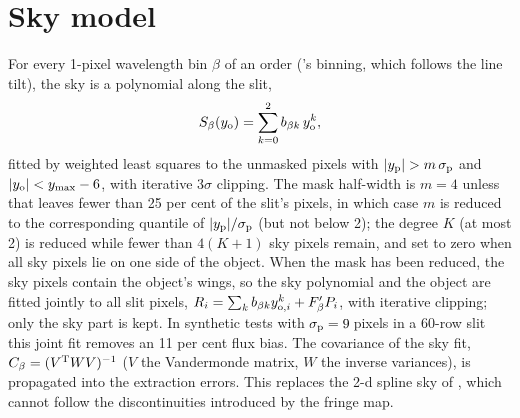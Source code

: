 \section{Sky model}
\label{sec:sky}
For every 1-pixel wavelength bin $\beta$ of an order (\banzai{}'s binning, which follows the line tilt), the sky is a
polynomial along the slit,
\begin{equation}
S_\beta(y_{\rm o})=\sum_{k=0}^{2}b_{\beta k}\,y_{\rm o}^k,
\label{eq:sky}
\end{equation}
fitted by weighted least squares to the unmasked pixels with $|y_{\rm p}|>m\,\sigma_{\rm p}$ and
$|y_{\rm o}|<y_{\rm max}-6$, with iterative $3\sigma$ clipping. The mask half-width is $m=4$ unless that leaves fewer
than 25 per cent of the slit's pixels, in which case $m$ is reduced to the corresponding quantile of
$|y_{\rm p}|/\sigma_{\rm p}$ (but not below 2); the degree $K$ (at most 2) is reduced while fewer than $4(K+1)$ sky pixels remain, and set
to zero when all sky pixels lie on one side of the object. When the mask has been reduced, the sky pixels contain the
object's wings, so the sky polynomial and the object are fitted jointly to all slit pixels,
$R_i=\sum_k b_{\beta k}y_{{\rm o},i}^k+F'_\beta P_i$, with iterative clipping; only the sky part is kept. In synthetic
tests with $\sigma_{\rm p}=9$\,pixels in a 60-row slit this joint fit removes an 11 per cent flux bias. The covariance
of the sky fit,
$C_\beta=(V^{\rm T}WV)^{-1}$ ($V$ the Vandermonde matrix, $W$ the inverse variances), is propagated into the
extraction errors. This replaces the 2-d spline sky of \banzai{} \citep{Kelson2003}, which cannot follow the
discontinuities introduced by the fringe map.

